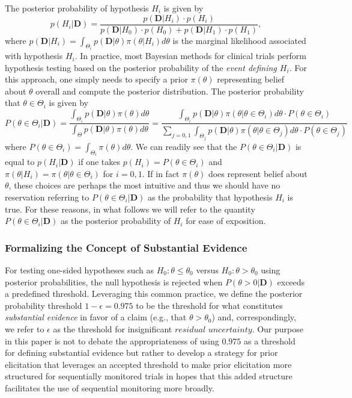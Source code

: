\documentclass[12pt]{article}
\begin{document}
The posterior probability of hypothesis $H_i$ is given by 
\begin{equation*}
p(H_i|\mathbf{D})=\frac{p(\mathbf{D}|H_i)\cdot p(H_i)}{p(\mathbf{D}|H_0)\cdot p(H_0)+p(\mathbf{D}|H_1)\cdot p(H_1)},
\end{equation*}
where $p(\mathbf{D}|H_i) = \int_{\Theta_i} p(\mathbf{D}|\theta)\pi(\theta|H_i)d\theta$ is the marginal likelihood associated with hypothesis $H_i$.
%
In practice, most Bayesian methods for clinical trials perform hypothesis testing based on the posterior probability of the \textit{event defining $H_i$}.
%
For this approach, one simply needs to specify a prior $\pi\left(\theta\right)$ representing belief about $\theta$ overall and compute the posterior distribution.
%
The posterior probability that $\theta\in\Theta_i$ is given by
\begin{equation*}
P(\theta\in\Theta_i|\mathbf{D})
=\frac{\int_{\Theta_i} p(\mathbf{D}|\theta)\pi (\theta)d\theta}{\int_{\Theta}p(\mathbf{D}|\theta)\pi(\theta) d\theta}
=\frac{\int_{\Theta_i} p(\mathbf{D}|\theta)\pi (\theta|\theta\in\Theta_i)d\theta\cdot P(\theta\in\Theta_i)}
      { \sum_{j=0,1} \int_{\Theta_j}p(\mathbf{D}|\theta)\pi (\theta|\theta\in\Theta_j)d\theta\cdot P(\theta\in\Theta_j) }
\end{equation*}
where $P(\theta\in\Theta_i)=\int_{\Theta_i}\pi(\theta)d\theta$. 
%
We can readily see that the $P(\theta\in\Theta_i|\mathbf{D})$ is equal to $p(H_i|\mathbf{D})$ if one takes
$p(H_i) =P(\theta\in\Theta_i)$ and $\pi\left(\theta \big| H_i\right) = \pi\left(\theta\big|\theta \in \Theta_i\right)$ for $i=0,1$.
%
If in fact $\pi\left(\theta\right)$ does represent belief about $\theta$, these choices are perhaps the most intuitive and thus 
we should have no reservation referring to $P(\theta\in\Theta_i|\mathbf{D})$ as the probability that hypothesis $H_i$ is true.
%
For these reasons, in what follows we will refer to the quantity $P(\theta\in\Theta_i|\mathbf{D})$ 
as the posterior probability of $H_i$ for ease of exposition.

\subsubsection{Formalizing the Concept of Substantial Evidence}
For testing one-sided hypotheses such as $H_0: \theta \le \theta_0$ versus $H_0: \theta > \theta_0$ using posterior probabilities, the null hypothesis 
is rejected when $P(\theta > 0 |\mathbf{D})$ exceeds a predefined threshold.
%
Leveraging this common practice, we define the posterior probability threshold $1-\epsilon=0.975$ to be the threshold for what constitutes 
\textit{substantial evidence} in favor of a claim (e.g., that $\theta > \theta_0$) and, correspondingly, we refer to $\epsilon$ as the threshold 
for insignificant $\textit{residual uncertainty}$.
%
Our purpose in this paper is not to debate the appropriateness of using $0.975$ as a threshold for defining substantial evidence but rather to 
develop a strategy for prior elicitation that leverages an accepted threshold to make prior elicitation more structured for sequentially monitored 
trials in hopes that this added structure facilitates the use of sequential monitoring more broadly.
\end{document}
